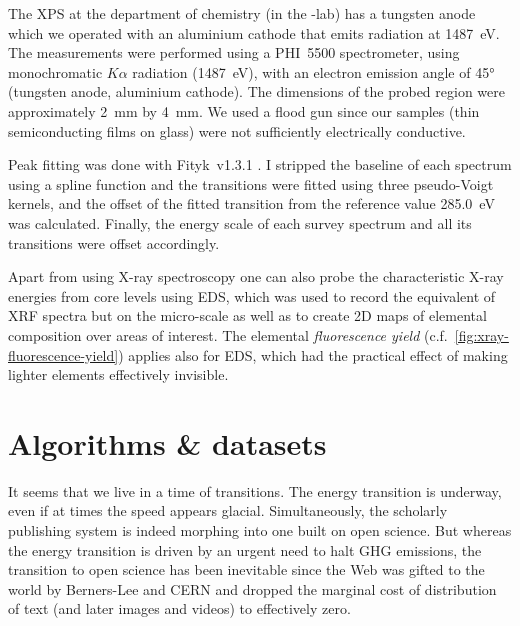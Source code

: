 \documentclass[webedition,openright,titles,swedish,english]{LuaUUThesis}\usepackage[]{graphicx}\usepackage[]{xcolor}
\newcommand{\cf}{c.f.}
\begin{document}
The \gls{XPS} at the department of chemistry (in the -lab) has a
tungsten anode which we operated with an aluminium cathode that emits radiation
at \qty{1487}{\eV}.
The measurements were performed using a PHI~5500 spectrometer, using
monochromatic  $K\alpha$ radiation (\qty{1487}{\eV}), with an electron
emission angle of \ang{45} (tungsten anode, aluminium cathode).
The dimensions of the probed region were approximately \qty{2}{\mm} by \qty{4}{\mm}.
We used a flood gun since our samples (thin semiconducting films on glass) were
not sufficiently electrically conductive.

Peak fitting was done with Fityk~v1.3.1 \cite{Wojdyr2010}.
I stripped the baseline of each  spectrum using a spline function
and the transitions were fitted using three pseudo-Voigt kernels, and
the offset of the fitted  transition from the reference value
\qty{285.0}{\eV} was calculated.
Finally, the energy scale of each survey spectrum and all its transitions
were offset accordingly.

Apart from using X-ray spectroscopy one can also probe the characteristic X-ray energies
from core levels using \gls{EDS}, which was used to record the equivalent of \gls{XRF} spectra
but on the micro-scale
as well as to create 2D maps of elemental composition over areas of interest.
The elemental \emph{fluorescence yield} (\cf\ \cref{fig:xray-fluorescence-yield})
applies also for \gls{EDS}, which had the practical effect of making lighter elements
effectively invisible.





\chapter[Algorithms \& datasets]{Algorithms \& datasets}
\label{ch:algorithms-datasets}


It seems that we live in a time of transitions.
The energy transition is underway, even if at times the speed appears glacial.
Simultaneously, the scholarly publishing system is indeed morphing into
one built on open science.
But whereas the energy transition is driven by an urgent need to halt
\gls{GHG} emissions, the transition to open science has been inevitable \cite{Dyson2000}
since the Web was gifted to the world by Berners-Lee and CERN \cite{Hoffmann2023}
and dropped the marginal cost of distribution of text (and later images and videos)
to effectively zero.
\end{document}
